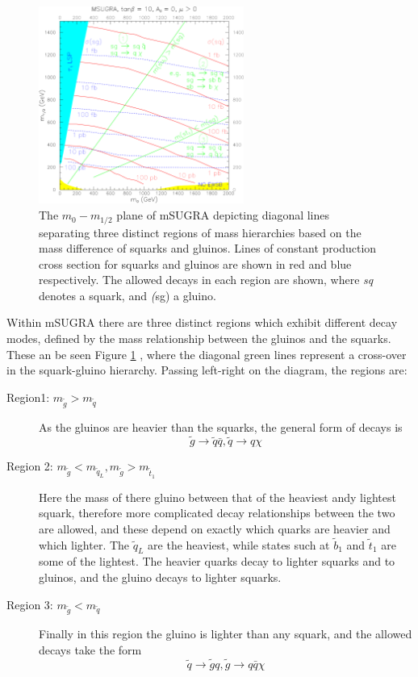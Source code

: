 \begin{figure}
\centering
\includegraphics[width=0.6\textwidth]{Figures/Theory/mSUGRA_TDR_1}
\caption{\label{fig:msugratdr}The $m_{0}-m_{1/2}$ plane of mSUGRA depicting diagonal lines separating three distinct regions of mass hierarchies based on the mass difference of squarks and gluinos. Lines of constant production cross section for squarks and gluinos are shown in red and blue respectively. The allowed decays in each region are shown, where \textit{sq} denotes a squark, and \textit(sg) a gluino.\cite{CMSTDRII}}

\end{figure}

Within mSUGRA there are three distinct regions which exhibit different decay modes, defined by the mass relationship between the gluinos and the squarks. These an be seen Figure \ref{fig:msugratdr} , where the diagonal green lines represent a cross-over in the squark-gluino hierarchy. Passing left-right on the diagram, the regions are:

\begin{description}
\item[Region1: $m_{\tilde{g}} > m_{\tilde{q}}$]{As the gluinos are heavier than the squarks, the general form of decays is
\begin{equation}
\tilde{g} \rightarrow \tilde{q} \bar{q} , \tilde{q} \rightarrow q \chi
\end{equation}
}
\item[Region 2: $m_{\tilde{g}}< m_{\tilde{q}_{L}}, m_{\tilde{g}}> m_{\tilde{t}_{1}} $]{Here the mass of there gluino between that of the heaviest andy lightest squark, therefore more complicated decay relationships between the two are allowed, and these depend on exactly which quarks are heavier and which lighter. The $\tilde{q}_{L}$ are the heaviest, while states such at $\tilde{b}_{1}$ and $\tilde{t}_{1}$ are some of the lightest. The heavier quarks decay to lighter squarks and to gluinos, and the gluino decays to lighter squarks. }
\item[Region 3: $m_{\tilde{g}} < m_{\tilde{q}}$]{Finally in this region the gluino is lighter than any squark, and the allowed decays take the form
\begin{equation}
\tilde{q} \rightarrow \tilde{g}q , \tilde{g} \rightarrow q\bar{q} \chi
\end{equation}
}
\end{description}

